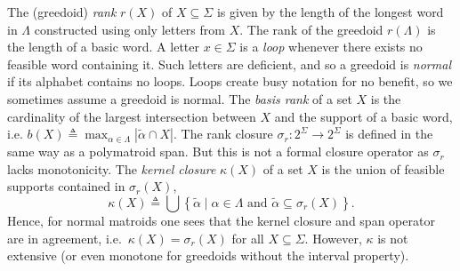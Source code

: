 \documentclass[11pt]{article}
\newcommand{\univ}{\Sigma}
\newcommand{\glang}{\Lambda}
\DeclareMathOperator*{\argmax}{arg\,max}
\newcommand{\rank}{r}
\begin{document}
The (greedoid) \emph{rank} $\rank(X)$ of $X\subseteq \univ$ is given by the length of the longest word in $\glang$ constructed using only letters from $X$.
The rank of the greedoid $r(\glang)$ is the length of a basic word.
A letter $x \in \univ$ is a \emph{loop} whenever there exists no feasible word containing it.
Such letters are deficient, and so a greedoid is \emph{normal} if its alphabet contains no loops.
Loops create busy notation for no benefit, so we sometimes assume a greedoid is normal.
The \emph{basis rank} of a set $X$ is the cardinality of the largest intersection between $X$ and the support of a basic word, i.e. $b(X)\triangleq \max_{\alpha\in\glang}|\widetilde{\alpha}\cap X|.$
The rank closure $\sigma_r:2^\univ\to 2^\univ$ is defined in the same way as a polymatroid span.
But this is not a formal closure operator as $\sigma_r$ lacks monotonicity.
The \emph{kernel closure} $\kappa(X)$ of a set $X$ is the union of feasible supports contained in $\sigma_{\rank}(X)$,
\begin{equation}\label{eq:flat support}
    \kappa(X) \triangleq \bigcup\left\{\widetilde{\alpha}\mid \alpha \in \glang\text{ and }\widetilde{\alpha} \subseteq \sigma_{\rank}(X)\right\}.
\end{equation}
Hence, for normal matroids one sees that the kernel closure and span operator are in agreement, i.e.\ $\kappa(X) = \sigma_{\rank}(X)$ for all $X \subseteq \univ$.
However, $\kappa$ is not extensive (or even monotone for greedoids without the interval property).
\end{document}
